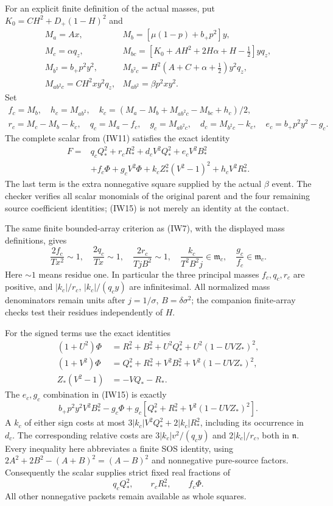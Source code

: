 For an explicit finite definition of the actual masses, put
$K_0=CH^2+D_+(1-H)^2$ and
\[
\begin{array}{ll}
 M_a=Ax,&M_b=[\mu(1-p)+b_+p^2]y,\\
 M_c=\alpha q_z,&
 M_{bc}=[K_0+AH^2+2H\alpha+H-\tfrac12]yq_z,\\
 M_{b^2}=b_+p^2y^2,&
 M_{b^2c}=H^2(A+C+\alpha+\tfrac12)y^2q_z,\\
 M_{ab^2c}=CH^2xy^2q_z,&M_{ab^2}=\beta p^2xy^2.
\end{array}
\]
Set
\[
\begin{gathered}
 f_c=M_b,\quad h_c=M_{ab^2},\quad
 k_c=(M_a-M_b+M_{ab^2c}-M_{bc}+h_c)/2,\\
 r_c=M_c-M_b-k_c,\quad q_c=M_a-f_c,\quad
 g_c=M_{ab^2c},\quad d_c=M_{b^2c}-k_c,
 \quad e_c=b_+p^2y^2-g_c.
\end{gathered}
\]
The complete scalar from (IW11) satisfies the exact identity
\[
\begin{split}
 F={}&q_cQ_*^2+r_cR_*^2+d_cV^2Q_*^2+e_cV^2B_*^2\\
 &+f_c\Phi+g_cV^2\Phi+k_cZ_*^2(V^2-1)^2+h_cV^2R_*^2.
\end{split}                                                     \tag{IW15}
\]
The last term is the extra nonnegative square supplied by the actual
$\beta$ event. The checker verifies all scalar monomials of the
original parent and the four remaining source coefficient identities;
(IW15) is not merely an identity at the contact.

The same finite bounded-array criterion as (IW7), with the displayed
mass definitions, gives
\[
 \frac{2f_c}{Tx^2}\sim1,\quad
 \frac{2q_c}{Tx}\sim1,\quad
 \frac{2r_c}{TjB^2}\sim1,\quad
 \frac{k_c}{T^2B^2j}\in\mathfrak m_c,\quad
 \frac{g_c}{f_c}\in\mathfrak m_c.                     \tag{IW16}
\]
Here $\sim1$ means residue one. In particular the three principal
masses $f_c,q_c,r_c$ are positive, and
$|k_c|/r_c$, $|k_c|/(q_cy)$ are infinitesimal.
All normalized mass denominators remain units after
$j=1/\sigma$, $B=\delta\sigma^2$; the companion finite-array
checks test their residues independently of $H$.

For the signed terms use the exact identities
\[
\begin{split}
 (1+U^2)\Phi&=R_*^2+B_*^2+U^2Q_*^2+U^2(1-UVZ_*)^2,\\
 (1+V^2)\Phi&=Q_*^2+R_*^2+V^2B_*^2+V^2(1-UVZ_*)^2,\\
 Z_*(V^2-1)&=-VQ_*-R_*.
\end{split}                                                     \tag{IW17}
\]
The $e_c,g_c$ combination in (IW15) is exactly
\[
 b_+p^2y^2V^2B_*^2-g_c\Phi
       +g_c[Q_*^2+R_*^2+V^2(1-UVZ_*)^2].
\]
A $k_c$ of either sign costs at most
$3|k_c|V^2Q_*^2+2|k_c|R_*^2$, including its occurrence in $d_c$.
The corresponding relative costs are
$3|k_c|v^2/(q_cy)$ and $2|k_c|/r_c$, both in $\mathfrak n$.
Every inequality here abbreviates a finite SOS identity, using
$2A^2+2B^2-(A+B)^2=(A-B)^2$ and nonnegative pure-source factors.
Consequently the scalar supplies strict fixed real fractions of
\[
                       q_cQ_*^2,\qquad r_cR_*^2,
                       \qquad f_c\Phi.                \tag{IW18}
\]
All other nonnegative packets remain available as whole squares.

